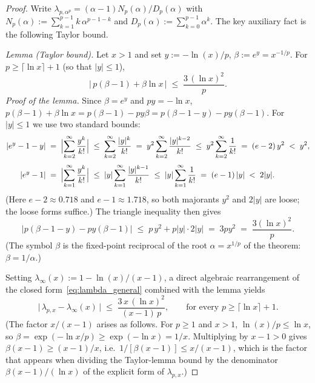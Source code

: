 \documentclass[11pt,a4paper]{article}
\theoremstyle{definition}
\begin{document}
\begin{proof}
Write $\lambda_{p,\alpha^p} = (\alpha-1) N_p(\alpha)/D_p(\alpha)$ with $N_p(\alpha) := \sum_{k=1}^{p-1} k\,\alpha^{p-1-k}$ and $D_p(\alpha) := \sum_{k=0}^{p-1}\alpha^k$. The key auxiliary fact is the following Taylor bound.

\medskip

\noindent\emph{Lemma (Taylor bound).} Let $x > 1$ and set $y := -\ln(x)/p$, $\beta := e^y = x^{-1/p}$. For $p \geq \lceil \ln x \rceil + 1$ (so that $|y| \leq 1$),
\[
  \bigl|\, p(\beta - 1) + \beta \ln x \,\bigr|
  \;\leq\; \frac{3\,(\ln x)^2}{p}.
\]
\emph{Proof of the lemma.} Since $\beta = e^y$ and $py = -\ln x$,
$p(\beta - 1) + \beta\ln x = p(\beta - 1) - p y \beta = p(\beta - 1 - y) - p y(\beta - 1)$.
For $|y| \leq 1$ we use two standard bounds:
\begin{align*}
  |e^y - 1 - y|
   &\;=\; \Bigl|\sum_{k=2}^{\infty} \frac{y^k}{k!}\Bigr|
    \;\leq\; \sum_{k=2}^{\infty} \frac{|y|^k}{k!}
    \;=\; y^2 \sum_{k=2}^{\infty} \frac{|y|^{k-2}}{k!}
    \;\leq\; y^2 \sum_{k=2}^{\infty} \frac{1}{k!}
    \;=\; (e - 2)\, y^2
    \;<\; y^2,
  \\[0.3em]
  |e^y - 1|
   &\;=\; \Bigl|\sum_{k=1}^{\infty} \frac{y^k}{k!}\Bigr|
    \;\leq\; |y| \sum_{k=1}^{\infty} \frac{|y|^{k-1}}{k!}
    \;\leq\; |y| \sum_{k=1}^{\infty} \frac{1}{k!}
    \;=\; (e - 1)\, |y|
    \;<\; 2|y|.
\end{align*}
(Here $e - 2 \approx 0.718$ and $e - 1 \approx 1.718$, so both majorants $y^2$ and $2|y|$ are loose; the loose forms suffice.) The triangle inequality then gives
\[
  |p(\beta - 1 - y) - p y(\beta - 1)|
  \;\leq\; p\, y^2 + p|y|\cdot 2|y|
  \;=\; 3 p y^2
  \;=\; \frac{3(\ln x)^2}{p}. \tag*{$\square$}
\]
(The symbol $\beta$ is the fixed-point reciprocal of the root $\alpha = x^{1/p}$ of the theorem: $\beta = 1/\alpha$.)

\medskip

\noindent Setting $\lambda_\infty(x) := 1 - \ln(x)/(x-1)$, a direct algebraic rearrangement of the closed form~\eqref{eq:lambda_general} combined with the lemma yields
\begin{equation}\label{eq:taylor-bound}
  \bigl|\, \lambda_{p,x} - \lambda_\infty(x) \,\bigr|
  \;\leq\; \frac{3\,x\,(\ln x)^2}{(x-1)\,p},
  \qquad \text{for every } p \geq \lceil \ln x \rceil + 1.
\end{equation}
(The factor $x/(x-1)$ arises as follows. For $p \geq 1$ and $x > 1$, $\ln(x)/p \leq \ln x$, so $\beta = \exp(-\ln x/p) \geq \exp(-\ln x) = 1/x$. Multiplying by $x - 1 > 0$ gives $\beta(x - 1) \geq (x-1)/x$, i.e.\ $1/[\beta(x-1)] \leq x/(x-1)$, which is the factor that appears when dividing the Taylor-lemma bound by the denominator $\beta(x-1)/(\ln x)$ of the explicit form of $\lambda_{p,x}$.)


\end{proof}
\end{document}
